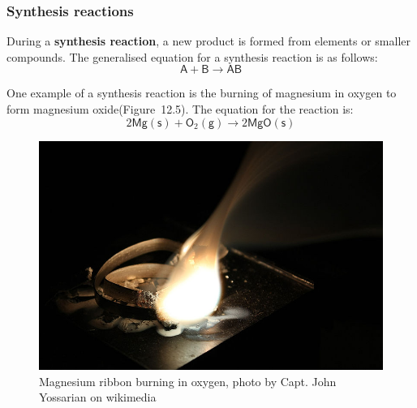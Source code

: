             \subsubsection*{Synthesis reactions}
            \nopagebreak
            \label{m38709*id63365}During a \textbf{synthesis reaction}, a new product is formed from elements or smaller compounds. The generalised equation for a synthesis reaction is as follows:
        \label{m38709*id63374}\nopagebreak\noindent
    \begin{equation*}
    \mathsf{A}+\mathsf{B}\to \mathsf{AB}
      \end{equation*}
    \par 
        \label{m38709*id63386}One example of a synthesis reaction is the burning of magnesium in oxygen to form magnesium oxide(Figure~12.5). The equation for the reaction is:
        \label{m38709*id63390}\nopagebreak\noindent
    \begin{equation*}
    2\mathsf{Mg (s)}+{\mathsf{O}}_{2} \mathsf{(g)} \to 2\mathsf{MgO (s)}
      \end{equation*}
\begin{figure}[H]
 \begin{center}
\includegraphics[width=.3\textwidth]{photos/Magnesium_ribbon_burning.jpg}
 \end{center}
\caption{Magnesium ribbon burning in oxygen, photo by Capt. John Yossarian on wikimedia}
\end{figure}


